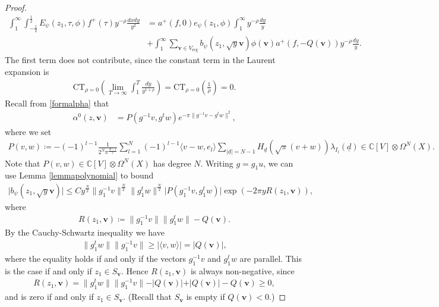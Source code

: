 \documentclass[twoside,a4paper,10pt]{article} %
\newcommand{\dxdy}{\frac{dxdy}{y^2}}
\newcommand{\uud}{\underline{d}}
\newcommand{\8}{\infty}
\newcommand{\vbf}{\mathbf{v}}
\newcommand{\C}{\mathbb{C}}
\newcommand{\reg}{\mathrm{reg}}
\newcommand{\CT}{\mathrm{CT}_{\rho=0}}
\newcommand{\intx}{\int_{-\frac{1}{2}}^{\frac{1}{2}}}
\theoremstyle{mytheoremstyle}
\theoremstyle{remark}
\numberwithin{equation}{section}
\begin{document}
\begin{proof}
\begin{align} \label{intermediate step}
\int_1^\8 \intx  E_\psi(z_1,\tau,\phi)f^+(\tau)y^{-\rho} \dxdy & = a^+(f,0)e_\psi(z_1,\phi) \int_1^\8 y^{-\rho}\frac{dy}{y} \\
& + \int_1^\8\sum_{\vbf \in V_\reg} b_\psi(z_1,\sqrt{y}\vbf) \phi(\vbf) a^+(f,-Q(\vbf))y^{-\rho}\frac{dy}{y}.
\end{align}
The first term does not contribute, since the constant term in the Laurent expansion is
\begin{align} \label{constant term CT}
\CT \left ( \lim_{T\rightarrow \8} \int_1^T \frac{dy}{y^{1+\rho}}\right ) = \CT \left (\frac{1}{\rho} \right )=0.
\end{align}
Recall from \eqref{formalpha} that
\begin{align}
\alpha^0(z,\vbf) &  = P(g^{-1}v,g^t w) e^{-\pi \lVert g^{-1}v-g^t w \rVert^2},
\end{align}
where we set
\begin{align}
P(v,w) \coloneqq -(-1)^{l-1}\frac{1}{2^{N}\pi^{\frac{N-1}{2}}} \sum_{l=1}^N (-1)^{l-1} \langle v-w, e_l \rangle \sum_{\vert \uud \vert=N-1} H_{\uud}(\sqrt{\pi}(v+w)) \lambda_{I_l}(\uud) \in \C[V] \otimes \Omega^N(X).
\end{align}
Note that $P(v,w) \in \C[V] \otimes \Omega^N(X)$ has degree $N$.
Writing $g=g_1 u$, we can use Lemma \ref{lemmapolynomial} to bound
\begin{align}
\vert b_\psi(z_1,\sqrt{y}\vbf) \vert \leq C y^\frac{N}{2} \lVert g_1^{-1}v \rVert^{\frac{N}{2}} \lVert g_1^tw \rVert^{\frac{N}{2}}   \vert P(g_1^{-1}v,g_1^tw)\vert \exp \left (-2\pi y R(z_1,\vbf) \right ),
\end{align}
where
\begin{align}
R(z_1,\vbf) \coloneqq \lVert g_1^{-1}v \rVert \lVert g_1^tw \rVert-Q(\vbf).
\end{align}
By the Cauchy-Schwartz inequality we have
\begin{align}
\lVert g_1^tw \rVert\lVert g_1^{-1}v \rVert \geq \vert \langle v,w \rangle \vert =\vert Q(\vbf) \vert,
\end{align}
where the equality holds if and only if the vectors $g_1^{-1}v$ and $g_1^tw$ are parallel. This is the case if and only if $z_1 \in S_\vbf$. Hence $R(z_1,\vbf)$ is always non-negative, since
\begin{align}
R(z_1,\vbf)= \lVert g_1^tw \rVert\lVert g_1^{-1}v \rVert -\vert Q(\vbf) \vert+\vert Q(\vbf) \vert-Q(\vbf) \geq 0,
\end{align} 
and is zero if and only if $z_1 \in S_\vbf$. (Recall that $S_\vbf$ is empty if $Q(\vbf) < 0$.)


\end{proof}
\end{document}
